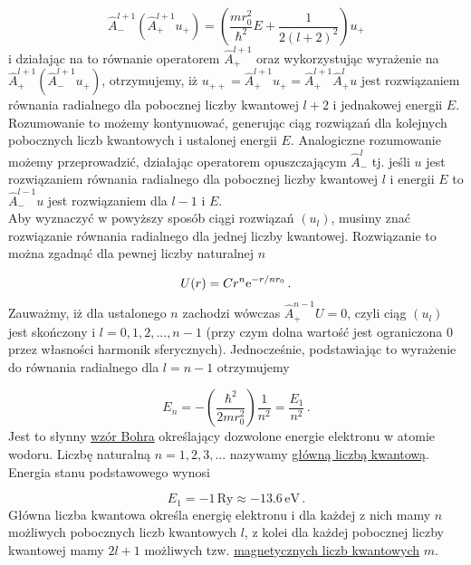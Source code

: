 \documentclass{myclass}
\begin{document}
\begin{equation*}
\hat{A}_-^{l+1}(\hat{A}_+^{l+1}u_+)=\left(\frac{mr_0^2}{\hbar^2}E+\frac{1}{2(l+2)^2}\right)u_+
\end{equation*}
i działając na to równanie operatorem \(\hat{A}_+^{l+1}\) oraz wykorzystując wyrażenie na
\(\hat{A}_+^{l+1}(\hat{A}_-^{l+1}u_+)\), otrzymujemy, iż
\(u_{++}=\hat{A}_+^{l+1}u_+=\hat{A}_+^{l+1}\hat{A}_+^lu\) jest rozwiązaniem równania radialnego dla
pobocznej liczby kwantowej \(l+2\) i jednakowej energii \(E\). Rozumowanie to możemy kontynuować,
generując ciąg rozwiązań dla kolejnych pobocznych liczb kwantowych i ustalonej energii \(E\).
Analogiczne rozumowanie możemy przeprowadzić, działając operatorem opuszczającym \(\hat{A}_-^l\) tj.
jeśli \(u\) jest rozwiązaniem równania radialnego dla pobocznej liczby kwantowej \(l\) i energii
\(E\) to \(\hat{A}_-^{l-1}u\) jest rozwiązaniem dla \(l-1\) i \(E\).\\

Aby wyznaczyć w powyższy sposób ciągi rozwiązań \((u_l)\), musimy znać rozwiązanie równania
radialnego dla jednej liczby kwantowej. Rozwiązanie to można zgadnąć dla pewnej liczby naturalnej
\(n\)

\begin{equation*}
U(r)=Cr^{n}\mathrm{e}^{-r/nr_0}\,.
\end{equation*}
Zauważmy, iż dla ustalonego \(n\) zachodzi wówczas \(\hat{A}_+^{n-1}U=0\), czyli ciąg \((u_l)\) jest
skończony i \(\boxed{l=0,1,2,...,n-1}\) (przy czym dolna wartość jest ograniczona 0 przez własności
harmonik sferycznych). Jednocześnie, podstawiając to wyrażenie do równania radialnego dla \(l=n-1\)
otrzymujemy

\begin{equation*}
\boxed{E_n=-\left(\frac{\hbar^2}{2mr_0^2}\right)\frac{1}{n^2}=\frac{E_1}{n^2}}\,.
\end{equation*}
Jest to słynny \underline{wzór Bohra} określający dozwolone energie elektronu w atomie wodoru.
Liczbę naturalną \(\boxed{n=1,2,3,...}\) nazywamy \underline{główną liczbą kwantową}. Energia stanu
podstawowego wynosi

\begin{equation*}
    E_1=-1\,\text{Ry}\approx-13.6\,\text{eV}\,.
\end{equation*}
Główna liczba kwantowa określa energię elektronu i dla każdej z nich mamy \(n\) możliwych pobocznych
liczb kwantowych \(l\), z kolei dla każdej pobocznej liczby kwantowej mamy \(2l+1\) możliwych tzw.
\underline{magnetycznych liczb kwantowych} \(m\).\\
\end{document}
